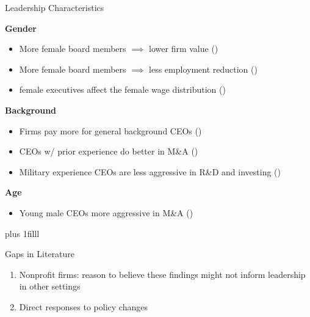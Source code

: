 \documentclass[notes,11pt, aspectratio=169]{beamer}
\newcommand{\btVFill}{\vskip0pt plus 1filll}
\begin{document}
\begin{frame}{Leadership Characteristics}

\vspace{1mm}

\textbf{Gender}
\begin{itemize}
    \item \small More female board members $\implies$ lower firm value \scriptsize(\cite{ahern2012changing}) \small
    \item \small More female board members $\implies$ less employment reduction \scriptsize (\cite{matsa2013female}) \small
    \item female executives affect the female wage distribution \scriptsize (\cite{flabbi2019female}) \small
\end{itemize}

\vspace{2mm}

\textbf{Background}
\begin{itemize}
    \item \small Firms pay more for general background CEOs \scriptsize (\cite{custodio2013generalists}) \small
    \item \small CEOs w/ prior experience do better in M\&A \scriptsize(\cite{custodio2013ceos}) \small
    \item \small Military experience CEOs are less aggressive in R\&D and investing \scriptsize (\cite{benmelech2015military})
\end{itemize}

\vspace{2mm}

\textbf{Age}
\begin{itemize}
    \item \small Young male CEOs more aggressive in M\&A \scriptsize (\cite{levi2010deal})
\end{itemize}

\btVFill\pause

\begin{block}{\normalsize Gaps in Literature}
    \small 
    \begin{enumerate}
        \item Nonprofit firms: reason to believe these findings might not inform leadership in other settings
        \item Direct responses to policy changes
    \end{enumerate}
\end{block}
\end{frame}
\end{document}

